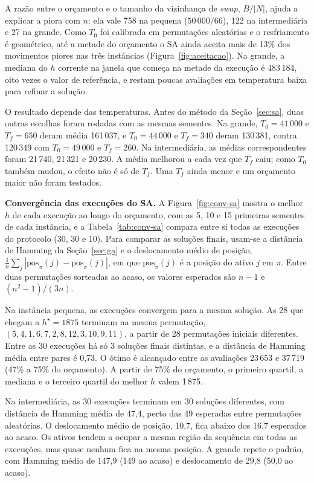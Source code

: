 A razão entre o orçamento e o tamanho da vizinhança de \textit{swap}, $B/|N|$, ajuda a explicar a piora com $n$: ela vale 758 na pequena ($50\,000/66$), 122 na intermediária e 27 na grande. Como $T_0$ foi calibrada em permutações aleatórias e o resfriamento é geométrico, até a metade do orçamento o SA ainda aceita mais de 13\% dos movimentos piores nas três instâncias (Figura~\ref{fig:aceitacao}). Na grande, a mediana do $h$ corrente na janela que começa na metade da execução é 483\,184, oito vezes o valor de referência, e restam poucas avaliações em temperatura baixa para refinar a solução.

O resultado depende das temperaturas. Antes do método da Seção~\ref{sec:sa}, duas outras escolhas foram rodadas com as mesmas sementes. Na grande, $T_0=41\,000$ e $T_f=650$ deram média 161\,037, e $T_0=44\,000$ e $T_f=340$ deram 130\,381, contra 120\,349 com $T_0=49\,000$ e $T_f=260$. Na intermediária, as médias correspondentes foram 21\,740, 21\,321 e 20\,230. A média melhorou a cada vez que $T_f$ caiu; como $T_0$ também mudou, o efeito não é só de $T_f$. Uma $T_f$ ainda menor e um orçamento maior não foram testados.

\textbf{Convergência das execuções do SA.} A Figura~\ref{fig:conv-sa} mostra o melhor $h$ de cada execução ao longo do orçamento, com as 5, 10 e 15 primeiras sementes de cada instância, e a Tabela~\ref{tab:conv-sa} compara entre si todas as execuções do protocolo (30, 30 e 10). Para comparar as soluções finais, usam-se a distância de Hamming da Seção~\ref{sec:ga} e o deslocamento médio de posição, $\frac1n\sum_j|\mathrm{pos}_\pi(j)-\mathrm{pos}_\sigma(j)|$, em que $\mathrm{pos}_\pi(j)$ é a posição do ativo $j$ em $\pi$. Entre duas permutações sorteadas ao acaso, os valores esperados são $n-1$ e $(n^2-1)/(3n)$.

Na instância pequena, as execuções convergem para a mesma solução. As 28 que chegam a $h^\star=1875$ terminam na mesma permutação, $(5,4,1,6,7,2,8,12,3,10,9,11)$, a partir de 28 permutações iniciais diferentes. Entre as 30 execuções há só 3 soluções finais distintas, e a distância de Hamming média entre pares é 0{,}73. O ótimo é alcançado entre as avaliações 23\,653 e 37\,719 (47\% a 75\% do orçamento). A partir de 75\% do orçamento, o primeiro quartil, a mediana e o terceiro quartil do melhor $h$ valem 1\,875.

Na intermediária, as 30 execuções terminam em 30 soluções diferentes, com distância de Hamming média de 47{,}4, perto das 49 esperadas entre permutações aleatórias. O deslocamento médio de posição, 10{,}7, fica abaixo dos 16{,}7 esperados ao acaso. Os ativos tendem a ocupar a mesma região da sequência em todas as execuções, mas quase nenhum fica na mesma posição. A grande repete o padrão, com Hamming médio de 147{,}9 (149 ao acaso) e deslocamento de 29{,}8 (50{,}0 ao acaso).

